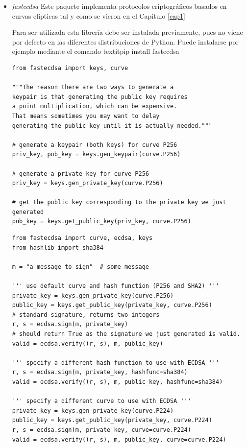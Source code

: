 \begin{itemize}
\item \textit{fastecdsa} \cite{fastecdsa} Este paquete implementa protocolos criptográficos basados en curvas elípticas tal y como se vieron en el Capítulo \ref{cap1} 

Para ser utilizada esta librería debe ser instalada previamente, pues no viene por defecto en las diferentes distribuciones de Python. Puede instalarse por ejemplo mediante el comando textit{pip install fastecdsa}

\lstset{language=Python}
\lstset{frame=lines}
\lstset{basicstyle=\footnotesize}
\begin{lstlisting}[title=Generación de claves]
from fastecdsa import keys, curve

"""The reason there are two ways to generate a 
keypair is that generating the public key requires
a point multiplication, which can be expensive. 
That means sometimes you may want to delay
generating the public key until it is actually needed."""

# generate a keypair (both keys) for curve P256
priv_key, pub_key = keys.gen_keypair(curve.P256)

# generate a private key for curve P256
priv_key = keys.gen_private_key(curve.P256)

# get the public key corresponding to the private key we just generated
pub_key = keys.get_public_key(priv_key, curve.P256)
\end{lstlisting}


\lstset{language=Python}
\lstset{frame=lines}
\lstset{basicstyle=\footnotesize}
\begin{lstlisting}[title=Firma y verificación]
from fastecdsa import curve, ecdsa, keys
from hashlib import sha384

m = "a_message_to_sign"  # some message

''' use default curve and hash function (P256 and SHA2) '''
private_key = keys.gen_private_key(curve.P256)
public_key = keys.get_public_key(private_key, curve.P256)
# standard signature, returns two integers
r, s = ecdsa.sign(m, private_key)
# should return True as the signature we just generated is valid.
valid = ecdsa.verify((r, s), m, public_key)

''' specify a different hash function to use with ECDSA '''
r, s = ecdsa.sign(m, private_key, hashfunc=sha384)
valid = ecdsa.verify((r, s), m, public_key, hashfunc=sha384)

''' specify a different curve to use with ECDSA '''
private_key = keys.gen_private_key(curve.P224)
public_key = keys.get_public_key(private_key, curve.P224)
r, s = ecdsa.sign(m, private_key, curve=curve.P224)
valid = ecdsa.verify((r, s), m, public_key, curve=curve.P224)
\end{lstlisting}

\end{itemize}


